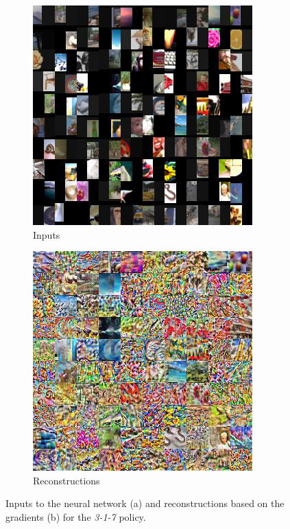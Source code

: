 \begin{figure}[hbt!]
\begin{subfigure}{.49\linewidth}\centering
\includegraphics[width=\textwidth]{grids/data_cifar100_arch_ResNet20-4_epoch_200_optim_inversed_mode_aug_auglist_3-1-7_rlabel_False_ORIGINALS.png}
\caption{Inputs}%
\end{subfigure}%
\hfill
\begin{subfigure}{.49\linewidth}\centering
\includegraphics[width=\textwidth]{grids/data_cifar100_arch_ResNet20-4_epoch_200_optim_inversed_mode_aug_auglist_3-1-7_rlabel_False_RECONSTRUCTIONS.png}
\caption{Reconstructions}%
\end{subfigure}%
\caption{Inputs to the neural network (a) and reconstructions based on the gradients (b) for the \textit{3-1-7} policy.}
    \label{fig:apprr}
\end{figure}

